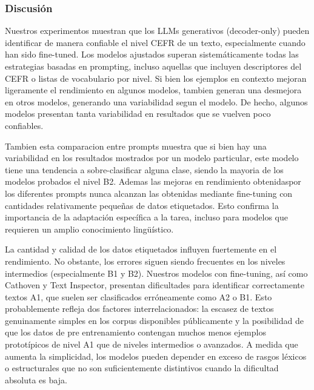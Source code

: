 

\subsubsection{Discusión}

Nuestros experimentos muestran que los LLMs generativos (decoder-only) pueden identificar de manera confiable el nivel CEFR de un texto, especialmente cuando han sido fine-tuned. Los modelos ajustados superan sistemáticamente todas las estrategias basadas en prompting, incluso aquellas que incluyen descriptores del CEFR o listas de vocabulario por nivel. Si bien los ejemplos en contexto mejoran ligeramente el rendimiento en algunos modelos, tambien generan una desmejora en otros modelos, generando una variabilidad segun el modelo. De hecho, algunos modelos presentan tanta variabilidad en resultados que se vuelven poco confiables.

Tambien esta comparacion entre prompts muestra que si bien hay una variabilidad en los resultados mostrados por un modelo particular, este modelo tiene una tendencia a sobre-clasificar alguna clase, siendo la mayoria de los modelos probados el nivel B2.
Ademas las mejoras en rendimiento obtenidaspor los diferentes prompts nunca alcanzan las obtenidas mediante fine-tuning con cantidades relativamente pequeñas de datos etiquetados. Esto confirma la importancia de la adaptación específica a la tarea, incluso para modelos que requieren un amplio conocimiento lingüístico.

La cantidad y calidad de los datos etiquetados influyen fuertemente en el rendimiento. No obstante, los errores siguen siendo frecuentes en los niveles intermedios (especialmente B1 y B2). Nuestros modelos con fine-tuning, así como Cathoven y Text Inspector, presentan dificultades para identificar correctamente textos A1, que suelen ser clasificados erróneamente como A2 o B1. Esto probablemente refleja dos factores interrelacionados: la escasez de textos genuinamente simples en los corpus disponibles públicamente y la posibilidad de que los datos de pre entrenamiento contengan muchos menos ejemplos prototípicos de nivel A1 que de niveles intermedios o avanzados. A medida que aumenta la simplicidad, los modelos pueden depender en exceso de rasgos léxicos o estructurales que no son suficientemente distintivos cuando la dificultad absoluta es baja.


